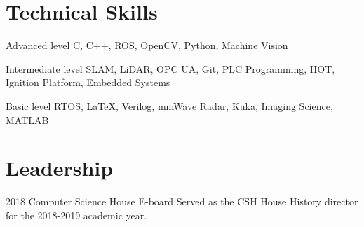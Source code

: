 \documentclass{tccv}
\begin{document}
\section{Technical Skills}
\begin{factlist}

\item{Advanced  level}
     {C, C++, ROS, OpenCV, Python, Machine Vision}

\item{Intermediate level}
     {SLAM, LiDAR, OPC UA, Git, PLC Programming, IIOT, Ignition Platform, Embedded Systems}

\item{Basic level}
     {RTOS, \LaTeX, Verilog, mmWave Radar, Kuka, Imaging Science, MATLAB}

\end{factlist}

\section{Leadership}
\begin{yearlist}

\item{2018}
     {Computer Science House E-board}
     {Served as the CSH House History director for the 2018-2019 academic year.}

\end{yearlist}
\end{document}
